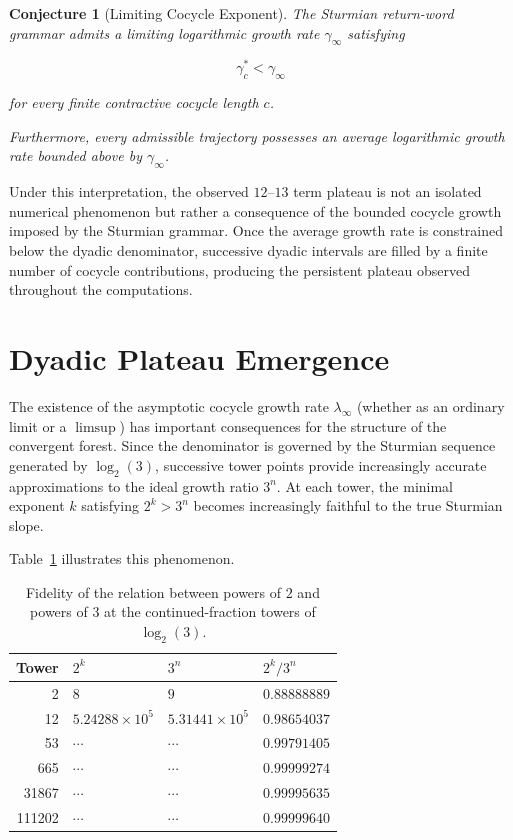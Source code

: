 \documentclass[12pt, oneside]{article}
\numberwithin{equation}{section}
\theoremstyle{definition}
\theoremstyle{plain}
\newtheorem{conjecture}[theorem]{Conjecture}
\theoremstyle{remark}
\begin{document}
\begin{conjecture}[Limiting Cocycle Exponent]
The Sturmian return-word grammar admits a limiting logarithmic growth rate
$\gamma_\infty$ satisfying

\[
\gamma_c^\ast < \gamma_\infty
\]

for every finite contractive cocycle length $c$.

Furthermore, every admissible trajectory possesses an average logarithmic
growth rate bounded above by $\gamma_\infty$.
\end{conjecture}

Under this interpretation, the observed $12$--$13$ term plateau is not an
isolated numerical phenomenon but rather a consequence of the bounded
cocycle growth imposed by the Sturmian grammar. Once the average growth rate
is constrained below the dyadic denominator, successive dyadic intervals are
filled by a finite number of cocycle contributions, producing the persistent
plateau observed throughout the computations.


\section{Dyadic Plateau Emergence}
\label{sec:dyadic-plateau-emergence}

The existence of the asymptotic cocycle growth rate $\lambda_\infty$ (whether
as an ordinary limit or a $\limsup$) has important consequences for the
structure of the convergent forest. Since the denominator is governed by
the Sturmian sequence generated by $\log_2(3)$, successive tower points
provide increasingly accurate approximations to the ideal growth ratio $3^n$.
At each tower, the minimal exponent $k$ satisfying $2^k>3^n$ becomes increasingly
faithful to the true Sturmian slope.

Table~\ref{tab:tower-fidelity} illustrates this phenomenon.

\begin{table}[h]
\centering
\caption{Fidelity of the relation between powers of $2$ and powers of $3$ at the continued-fraction towers of $\log_2(3)$.}
\label{tab:tower-fidelity}
\begin{tabular}{r l l l}
\hline
Tower & $2^k$ & $3^n$ & $2^k/3^n$\\
\hline
2      & $8$ & $9$ & $0.88888889$\\
12     & $5.24288\times10^5$ & $5.31441\times10^5$ & $0.98654037$\\
53     & $\cdots$ & $\cdots$ & $0.99791405$\\
665    & $\cdots$ & $\cdots$ & $0.99999274$\\
31867  & $\cdots$ & $\cdots$ & $0.99995635$\\
111202 & $\cdots$ & $\cdots$ & $0.99999640$\\
\hline
\end{tabular}
\end{table}
\end{document}
